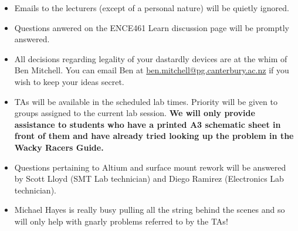 \documentclass[11pt, a4paper]{article}
\begin{document}
\begin{itemize}
\item Emails to the lecturers (except of a personal nature) will be
  quietly ignored.

\item Questions anwered on the ENCE461 Learn discussion page will be
  promptly answered.

\item All decisions regarding legality of your dastardly devices are
  at the whim of Ben Mitchell.  You can email Ben at
  \href{mailto://ben.mitchell@pg.canterbury.ac.nz}{ben.mitchell@pg.canterbury.ac.nz}
  if you wish to keep your ideas secret.

\item TAs will be available in the scheduled lab times.  Priority will
  be given to groups assigned to the current lab session. \textbf{We
    will only provide assistance to students who have a printed A3
    schematic sheet in front of them and have already tried looking up
    the problem in the Wacky Racers Guide.}

\item Questions pertaining to Altium and surface mount rework will be
  answered by Scott Lloyd (SMT Lab technician) and Diego Ramirez
  (Electronics Lab technician).

\item Michael Hayes is really busy pulling all the string behind the
  scenes and so will only help with gnarly problems referred to by the
  TAs!

\end{itemize}
\end{document}
